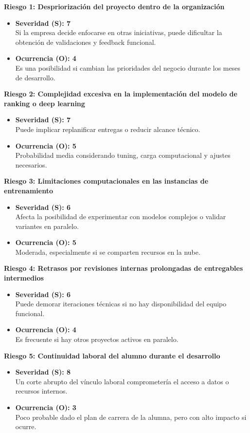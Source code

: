 \documentclass[
11pt, %
]{charter}
\begin{document}
\textbf{Riesgo 1: Despriorización del proyecto dentro de la organización}
\begin{itemize}
  \item \textbf{Severidad (S): 7} \\
  Si la empresa decide enfocarse en otras iniciativas, puede dificultar la obtención de validaciones y feedback funcional.
  \item \textbf{Ocurrencia (O): 4} \\
  Es una posibilidad si cambian las prioridades del negocio durante los meses de desarrollo.
\end{itemize}

\textbf{Riesgo 2: Complejidad excesiva en la implementación del modelo de ranking o deep learning}
\begin{itemize}
  \item \textbf{Severidad (S): 7} \\
  Puede implicar replanificar entregas o reducir alcance técnico.
  \item \textbf{Ocurrencia (O): 5} \\
  Probabilidad media considerando tuning, carga computacional y ajustes necesarios.
\end{itemize}

\textbf{Riesgo 3: Limitaciones computacionales en las instancias de entrenamiento}
\begin{itemize}
  \item \textbf{Severidad (S): 6} \\
  Afecta la posibilidad de experimentar con modelos complejos o validar variantes en paralelo.
  \item \textbf{Ocurrencia (O): 5} \\
  Moderada, especialmente si se comparten recursos en la nube.
\end{itemize}

\textbf{Riesgo 4: Retrasos por revisiones internas prolongadas de entregables intermedios}
\begin{itemize}
  \item \textbf{Severidad (S): 6} \\
  Puede demorar iteraciones técnicas si no hay disponibilidad del equipo funcional.
  \item \textbf{Ocurrencia (O): 4} \\
  Es frecuente si hay otros proyectos activos en paralelo.
\end{itemize}

\textbf{Riesgo 5: Continuidad laboral del alumno durante el desarrollo}
\begin{itemize}
  \item \textbf{Severidad (S): 8} \\
  Un corte abrupto del vínculo laboral comprometería el acceso a datos o recursos internos.
  \item \textbf{Ocurrencia (O): 3} \\
  Poco probable dado el plan de carrera de la alumna, pero con alto impacto si ocurre.
\end{itemize}
\end{document}
